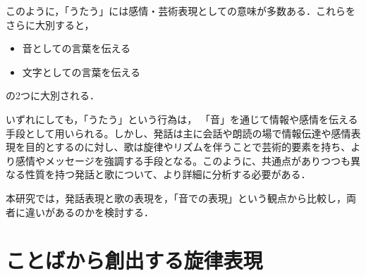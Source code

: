 このように，「うたう」には感情・芸術表現としての意味が多数ある．これらをさらに大別すると，
\begin{itemize}
  \item 音としての言葉を伝える
  \item 文字としての言葉を伝える
\end{itemize}
の2つに大別される．%

いずれにしても，「うたう」という行為は，%
「音」を通じて情報や感情を伝える手段として用いられる。しかし、発話は主に会話や朗読の場で情報伝達や感情表現を目的とするのに対し、歌は旋律やリズムを伴うことで芸術的要素を持ち、より感情やメッセージを強調する手段となる。このように、共通点がありつつも異なる性質を持つ発話と歌について、より詳細に分析する必要がある．

本研究では，発話表現と歌の表現を，「音での表現」という観点から比較し，両者に違いがあるのかを検討する．




\section{ことばから創出する旋律表現}



